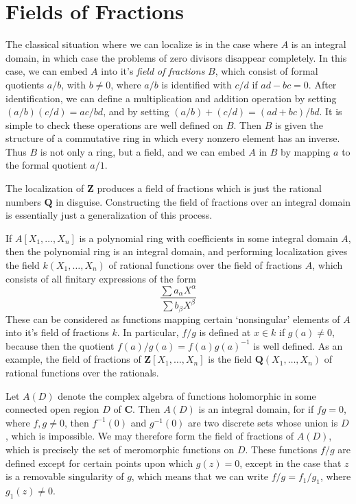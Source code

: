 \section{Fields of Fractions}

The classical situation where we can localize is in the case where $A$ is an integral domain, in which case the problems of zero divisors disappear completely. In this case, we can embed $A$ into it's \emph{field of fractions} $B$, which consist of formal quotients $a/b$, with $b \neq 0$, where $a/b$ is identified with $c/d$ if $ad - bc = 0$. After identification, we can define a multiplication and addition operation by setting $(a/b)(c/d) = ac/bd$, and by setting $(a/b) + (c/d) = (ad + bc)/bd$. It is simple to check these operations are well defined on $B$. Then $B$ is given the structure of a commutative ring in which every nonzero element has an inverse. Thus $B$ is not only a ring, but a field, and we can embed $A$ in $B$ by mapping $a$ to the formal quotient $a/1$.

\begin{example}
    The localization of $\mathbf{Z}$ produces a field of fractions which is just the rational numbers $\mathbf{Q}$ in disguise. Constructing the field of fractions over an integral domain is essentially just a generalization of this process.
\end{example}

\begin{example}
    If $A[X_1, \dots, X_n]$ is a polynomial ring with coefficients in some integral domain $A$, then the polynomial ring is an integral domain, and performing localization gives the field $k(X_1, \dots, X_n)$ of rational functions over the field of fractions $A$, which consists of all finitary expressions of the form
    \[ \frac{\sum a_\alpha X^\alpha}{\sum b_\beta X^\beta} \]
    These can be considered as functions mapping certain `nonsingular' elements of $A$ into it's field of fractions $k$. In particular, $f/g$ is defined at $x \in k$ if $g(a) \neq 0$, because then the quotient $f(a)/g(a) = f(a) g(a)^{-1}$ is well defined. As an example, the field of fractions of $\mathbf{Z}[X_1, \dots, X_n]$ is the field $\mathbf{Q}(X_1, \dots, X_n)$ of rational functions over the rationals.
\end{example}

\begin{example}
    Let $A(D)$ denote the complex algebra of functions holomorphic in some connected open region $D$ of $\mathbf{C}$. Then $A(D)$ is an integral domain, for if $fg = 0$, where $f,g \neq 0$, then $f^{-1}(0)$ and $g^{-1}(0)$ are two discrete sets whose union is $D$, which is impossible. We may therefore form the field of fractions of $A(D)$, which is precisely the set of meromorphic functions on $D$. These functions $f/g$ are defined except for certain points upon which $g(z) = 0$, except in the case that $z$ is a removable singularity of $g$, which means that we can write $f/g = f_1/g_1$, where $g_1(z) \neq 0$.
\end{example}


